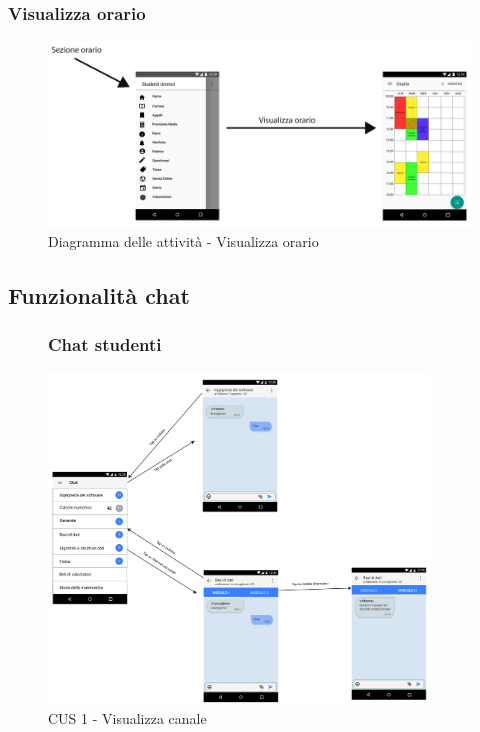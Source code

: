 \subsubsection{Visualizza orario}
\begin{figure}[H]
	\centering
	\includegraphics[width=\textwidth]{imgs/gruppo2/activity-orario-visualizza-orario}
	\caption{Diagramma delle attività - Visualizza orario}
	\label{fig:act-diag-orario-visualizza-orario}
\end{figure}

\subsection{Funzionalità chat}

\begin{figure}
	\subsubsection{Chat studenti}
	\centering
	\includegraphics[width=0.9\textwidth]{imgs/gruppo6/activities/act_cus1_visualizza_canale.pdf}
	\caption{CUS 1 - Visualizza canale}
	\label{fig:act-cus1}
\end{figure}

